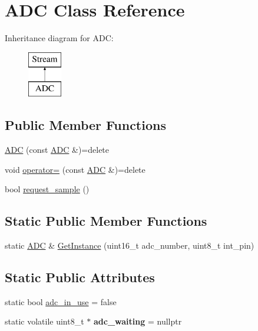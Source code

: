 \hypertarget{class_a_d_c}{}\section{A\+DC Class Reference}
\label{class_a_d_c}
Inheritance diagram for A\+DC\+:\begin{figure}[H]
\begin{center}
\leavevmode
\includegraphics[height=2.000000cm]{class_a_d_c}
\end{center}
\end{figure}
\subsection*{Public Member Functions}
\begin{DoxyCompactItemize}
\item 
\hyperlink{class_a_d_c_a50cb1d4e5bb8e3812732d9efdde4af67}{A\+DC} (const \hyperlink{class_a_d_c}{A\+DC} \&)=delete
\item 
void \hyperlink{class_a_d_c_a8cc7efa85ad7492480bdfd9f49039150}{operator=} (const \hyperlink{class_a_d_c}{A\+DC} \&)=delete
\item 
bool \hyperlink{class_a_d_c_a8264cbf9141f229f5117718e78f01173}{request\+\_\+sample} ()
\end{DoxyCompactItemize}
\subsection*{Static Public Member Functions}
\begin{DoxyCompactItemize}
\item 
static \hyperlink{class_a_d_c}{A\+DC} \& \hyperlink{class_a_d_c_aa9294ebc0b114898aa33d9e09537bdb5}{Get\+Instance} (uint16\+\_\+t adc\+\_\+number, uint8\+\_\+t int\+\_\+pin)
\end{DoxyCompactItemize}
\subsection*{Static Public Attributes}
\begin{DoxyCompactItemize}
\item 
static bool \hyperlink{class_a_d_c_a861d0d9bd4dc73f9811c129548fb9a48}{adc\+\_\+in\+\_\+use} = false
\item 
static volatile uint8\+\_\+t $\ast$ {\bfseries adc\+\_\+waiting} = nullptr\hypertarget{class_a_d_c_a472fee5492ee8e10d5baf38b67db18af}{}\label{class_a_d_c_a472fee5492ee8e10d5baf38b67db18af}

\end{DoxyCompactItemize}
